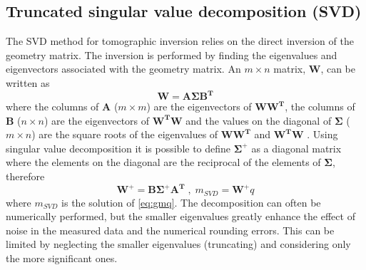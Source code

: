 \subsection{Truncated singular value decomposition (SVD)}
The SVD method for tomographic inversion relies on the direct inversion of the geometry matrix. The inversion is performed by finding the eigenvalues and eigenvectors associated with the geometry matrix. An $m \times n$ matrix, $\bm{W}$, can be written as 
\begin{equation}
\bm{W} = \bm{A \Sigma B^T}
\label{eq:svg1}
\end{equation}
where the columns of $\bm{A}$ ($m \times m$) are the eigenvectors of $\bm{WW^T}$, the columns of $\bm{B}$ ($n \times n$) are the eigenvectors of $\bm{W^TW}$ and the values on the diagonal of $\bm{\Sigma}$ ($m \times n$) are the square roots of the eigenvalues of $\bm{WW^T}$ and $\bm{W^TW}$ \cite{Hansen1992}. Using singular value decomposition it is possible to define $\bm{\Sigma}^+$ as a diagonal matrix where the elements on the diagonal are the reciprocal of the elements of $\bm{\Sigma}$, therefore
\begin{equation}
\bm{W^+} = \bm{B \Sigma^+ A^T} \; , \; m_{SVD} = \bm{W^+} q
\label{eq:svg2}
\end{equation}
where $m_{SVD}$ is the solution of \autoref{eq:gmq}.
The decomposition can often be numerically performed, but the smaller eigenvalues greatly enhance the effect of noise in the measured data and the numerical rounding errors. \cite{Schou2015} This can be limited by neglecting the smaller eigenvalues (truncating) and considering only the more significant ones.

